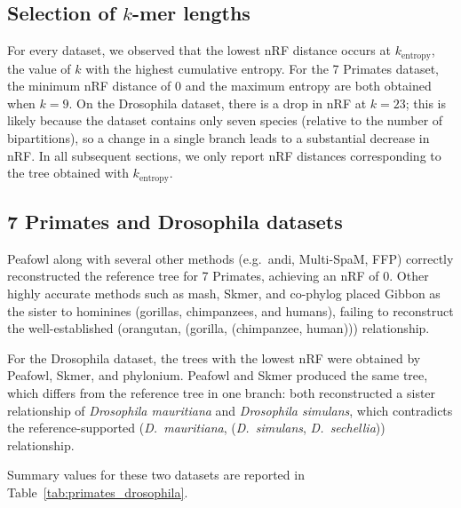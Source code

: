 \documentclass[11pt]{article}
\begin{document}
\subsection{Selection of $k$-mer lengths}

For every dataset, we observed that the lowest nRF distance occurs at $k_{\text{entropy}}$, the value of $k$ with the highest cumulative entropy. For the 7 Primates dataset, the minimum nRF distance of 0 and the maximum entropy are both obtained when $k=9$. On the Drosophila dataset, there is a drop in nRF at $k=23$; this is likely because the dataset contains only seven species (relative to the number of bipartitions), so a change in a single branch leads to a substantial decrease in nRF. In all subsequent sections, we only report nRF distances corresponding to the tree obtained with $k_{\text{entropy}}$.

\subsection{7 Primates and Drosophila datasets}

Peafowl along with several other methods (e.g.\ andi, Multi-SpaM, FFP) correctly reconstructed the reference tree for 7 Primates, achieving an nRF of 0. Other highly accurate methods such as mash, Skmer, and co-phylog placed Gibbon as the sister to hominines (gorillas, chimpanzees, and humans), failing to reconstruct the well-established (orangutan, (gorilla, (chimpanzee, human))) relationship.

For the Drosophila dataset, the trees with the lowest nRF were obtained by Peafowl, Skmer, and phylonium. Peafowl and Skmer produced the same tree, which differs from the reference tree in one branch: both reconstructed a sister relationship of \emph{Drosophila mauritiana} and \emph{Drosophila simulans}, which contradicts the reference-supported (\emph{D.\ mauritiana}, (\emph{D.\ simulans}, \emph{D.\ sechellia})) relationship.

Summary values for these two datasets are reported in Table~\ref{tab:primates_drosophila}.
\end{document}
